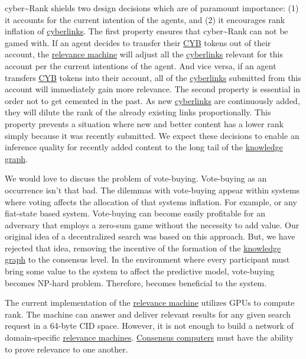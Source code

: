 \documentclass[8pt,oneside]{amsart}
\newcommand{\linkgreen}[2]{\href{#1}{\color{green}{#2}}}
\begin{document}
cyber\~{}Rank shields two design decisions which are of paramount importance: (1) it accounts for the current intention of the agents, and (2) it encourages rank inflation of {\hyperref[cyberlinks]{cyberlinks}}. The first property ensures that cyber\~{}Rank can not be gamed with. If an agent decides to transfer their {\hyperref[cyb]{CYB}} tokens out of their account, the {\hyperref[relevance-machine]{relevance machine}} will adjust all the {\hyperref[cyberlinks]{cyberlinks}} relevant for this account per the current intentions of the agent. And vice versa, if an agent transfers {\hyperref[cyb]{CYB}} tokens into their account, all of the {\hyperref[cyberlinks]{cyberlinks}} submitted from this account will immediately gain more relevance. The second property is essential in order not to get cemented in the past. As new {\hyperref[cyberlinks]{cyberlinks}} are continuously added, they will dilute the rank of the already existing links proportionally. This property prevents a situation where new and better content has a lower rank simply because it was recently submitted. We expect these decisions to enable an inference quality for recently added content to the long tail of the {\hyperref[knowledge-graph]{knowledge graph}}.

We would love to discuss the problem of vote-buying. Vote-buying as an occurrence isn't that bad. The dilemmas with vote-buying appear within systems where voting affects the allocation of that systems inflation. For example, \linkgreen{http://ipfs.io/ipfs/QmepU77tqMAHHuiSASUvUnu8f8ENuPF2Kfs97WjLn8vAS3}{Steem}
or any fiat-state based system. Vote-buying can become easily profitable for an adversary that employs a zero-sum game without the necessity to add value. Our original idea of a decentralized search was based on this approach. But, we have rejected that idea, removing the incentive of the formation of the {\hyperref[knowledge-graph]{knowledge graph}} to the consensus level. In the environment where every participant must bring some value to the system to affect the predictive model, vote-buying becomes NP-hard problem. Therefore, becomes beneficial to the system.

The current implementation of the {\hyperref[relevance-machine]{relevance machine}} utilizes GPUs to compute rank. The machine can answer and deliver relevant results for any given search request in a 64-byte CID space. However, it is not enough to build a network of domain-specific {\hyperref[relevance-machine]{relevance machines}}. {\hyperref[consensus-computer]{Consensus computers}} must have the ability to prove relevance to one another.
\end{document}
